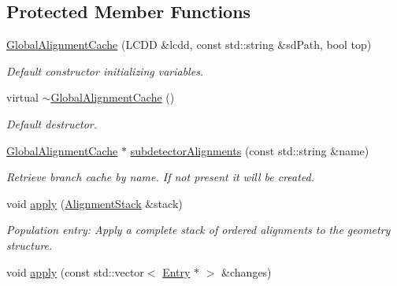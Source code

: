 \subsection*{Protected Member Functions}
\begin{DoxyCompactItemize}
\item 
\hyperlink{class_d_d4hep_1_1_alignments_1_1_global_alignment_cache_aab3ed850c3c2d49c4a19a26ab7fc0e07}{GlobalAlignmentCache} (LCDD \&lcdd, const std::string \&sdPath, bool top)
\begin{DoxyCompactList}\small\item\em Default constructor initializing variables. \item\end{DoxyCompactList}\item 
virtual \hyperlink{class_d_d4hep_1_1_alignments_1_1_global_alignment_cache_a130666c02ddc1ffee8ae3d0da29dea49}{$\sim$GlobalAlignmentCache} ()
\begin{DoxyCompactList}\small\item\em Default destructor. \item\end{DoxyCompactList}\item 
\hyperlink{class_d_d4hep_1_1_alignments_1_1_global_alignment_cache}{GlobalAlignmentCache} $\ast$ \hyperlink{class_d_d4hep_1_1_alignments_1_1_global_alignment_cache_ac38294d179431c5078d6ec42f54893be}{subdetectorAlignments} (const std::string \&name)
\begin{DoxyCompactList}\small\item\em Retrieve branch cache by name. If not present it will be created. \item\end{DoxyCompactList}\item 
void \hyperlink{class_d_d4hep_1_1_alignments_1_1_global_alignment_cache_a9f2812b2517bb488f3d99068fc6f4318}{apply} (\hyperlink{class_d_d4hep_1_1_alignments_1_1_alignment_stack}{AlignmentStack} \&stack)
\begin{DoxyCompactList}\small\item\em Population entry: Apply a complete stack of ordered alignments to the geometry structure. \item\end{DoxyCompactList}\item 
void \hyperlink{class_d_d4hep_1_1_alignments_1_1_global_alignment_cache_ac8287bc1293ffc982e0c1c0a76761945}{apply} (const std::vector$<$ \hyperlink{struct_d_d4hep_1_1_alignments_1_1_alignment_stack_1_1_stack_entry}{Entry} $\ast$ $>$ \&changes)

\end{DoxyCompactItemize}
